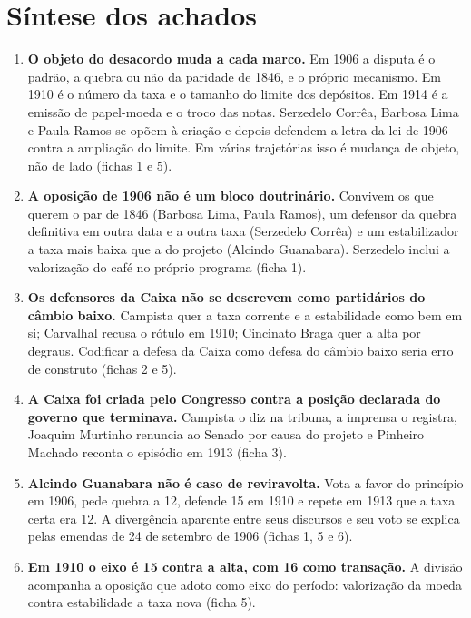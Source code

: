 \chapter{Síntese dos achados}


\begin{enumerate}[leftmargin=*]
\item \textbf{O objeto do desacordo muda a cada marco.} Em 1906 a disputa é o
padrão, a quebra ou não da paridade de 1846, e o próprio mecanismo. Em 1910 é o
número da taxa e o tamanho do limite dos depósitos. Em 1914 é a emissão de
papel-moeda e o troco das notas. Serzedelo Corrêa, Barbosa Lima e Paula Ramos
se opõem à criação e depois defendem a letra da lei de 1906 contra a ampliação
do limite. Em várias trajetórias isso é mudança de objeto, não de lado (fichas
1 e 5).

\item \textbf{A oposição de 1906 não é um bloco doutrinário.} Convivem os que
querem o par de 1846 (Barbosa Lima, Paula Ramos), um defensor da quebra
definitiva em outra data e a outra taxa (Serzedelo Corrêa) e um estabilizador a
taxa mais baixa que a do projeto (Alcindo Guanabara). Serzedelo inclui a
valorização do café no próprio programa (ficha 1).

\item \textbf{Os defensores da Caixa não se descrevem como partidários do
câmbio baixo.} Campista quer a taxa corrente e a estabilidade como bem em si;
Carvalhal recusa o rótulo em 1910; Cincinato Braga quer a alta por degraus.
Codificar a defesa da Caixa como defesa do câmbio baixo seria erro de
construto (fichas 2 e 5).

\item \textbf{A Caixa foi criada pelo Congresso contra a posição declarada do governo que
terminava.} Campista o diz na tribuna, a imprensa o registra, Joaquim Murtinho
renuncia ao Senado por causa do projeto e Pinheiro Machado reconta o episódio
em 1913 (ficha 3).

\item \textbf{Alcindo Guanabara não é caso de reviravolta.} Vota a favor do
princípio em 1906, pede quebra a 12, defende 15 em 1910 e repete em 1913 que a
taxa certa era 12. A divergência aparente entre seus discursos e seu voto se
explica pelas emendas de 24 de setembro de 1906 (fichas 1, 5 e 6).

\item \textbf{Em 1910 o eixo é 15 contra a alta, com 16 como transação.} A
divisão acompanha a oposição que adoto como eixo do período:
valorização da moeda contra estabilidade a taxa nova (ficha 5).


\end{enumerate}
